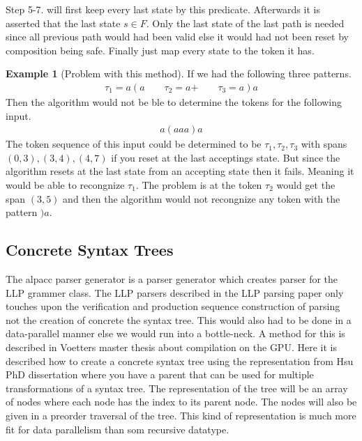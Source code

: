 \documentclass[a4paper,12pt]{article}
\theoremstyle{definition}
\newtheorem{example}{Example}[section]
\begin{document}
Step 5-7. will first keep every last state by this predicate. Afterwards it is asserted that the last state $s \in F$. Only the last state of the last path is needed since all previous path would had been valid else it would had not been reset by composition being safe. Finally just map every state to the token it has.

\begin{example}[Problem with this method]\label{ex:overlap}
  If we had the following three patterns.
  \begin{align*}
    \tau_1 = a(a \qquad \tau_2 = a\text{+} \qquad \tau_3 = a)a
  \end{align*}
  Then the algorithm would not be ble to determine the tokens for the following input.
  \begin{align*}
    a(aaa)a
  \end{align*}
  The token sequence of this input could be determined to be $\tau_1, \tau_2, \tau_3$ with spans $(0, 3), (3, 4), (4, 7)$ if you reset at the last acceptings state. But since the algorithm resets at the last state from an accepting state then it fails. Meaning it would be able to recongnize $\tau_1$. The problem is at the token $\tau_2$ would get the span $(3, 5)$ and then the algorithm would not recongnize any token with the pattern $)a$.
\end{example}
\subsection{Concrete Syntax Trees}
The alpacc parser generator is a parser generator which creates parser for the LLP grammer class. The LLP parsers described in the LLP parsing paper \cite{Vagner2007} only touches upon the verification and production sequence construction of parsing not the creation of concrete the syntax tree. This would also had to be done in a data-parallel manner else we would run into a bottle-neck. A method for this is described in Voetters master thesis \cite[32-33]{voetter2021} about compilation on the GPU. Here it is described how to create a concrete syntax tree using the representation from Hsu PhD dissertation \cite[77-81]{hsu2019} where you have a parent that can be used for multiple transformations of a syntax tree. The representation of the tree will be an array of nodes where each node has the index to its parent node. The nodes will also be given in a preorder traversal of the tree. This kind of representation is much more fit for data parallelism than som recursive datatype.
\end{document}
